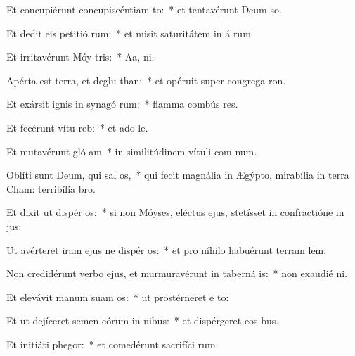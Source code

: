 \item Et concupiérunt concupiscéntiam  to:~* et tentavérunt Deum  so.
\item Et dedit eis petitió rum:~* et misit saturitátem in á rum.
\item Et irritavérunt Móy  tris:~* Aa,  ni.
\item Apérta est terra, et deglu than:~* et opéruit super congrega ron.
\item Et exársit ignis in synagó rum:~* flamma combús res.
\item Et fecérunt vítu  reb:~* et ado le.
\item Et mutavérunt gló am~* in similitúdinem vítuli com num.
\item Oblíti sunt Deum, qui sal os,~* qui fecit magnália in Ægýpto, mirabília in terra Cham: terribília   bro.
\item Et dixit ut dispér os:~* si non Móyses, eléctus ejus, stetísset in confractióne in  jus:
\item Ut avérteret iram ejus ne dispér os:~* et pro níhilo habuérunt terram lem:
\item Non credidérunt verbo ejus, et murmuravérunt in taberná is:~* non exaudié  ni.
\item Et elevávit manum suam  os:~* ut prostérneret e  to:
\item Et ut dejíceret semen eórum in nibus:~* et dispérgeret eos  bus.
\item Et initiáti  phegor:~* et comedérunt sacrifíci rum.
